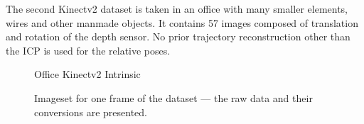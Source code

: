 The second Kinectv2 dataset is taken in an office with many smaller elements, wires and other manmade objects.
It contains 57 images composed of translation and rotation of the depth sensor.
No prior trajectory reconstruction other than the ICP is used for the relative poses.
\begin{figure}[H]
\CenterFloatBoxes%
\begin{floatrow}
{\caption{Office Kinectv2 Intrinsic}\label{tab:office_intrinsic}}%
    {\caption{Imageset for one frame of the dataset --- the raw data and their conversions are presented.}\label{fig:office_data}}
\end{floatrow}
\end{figure}

